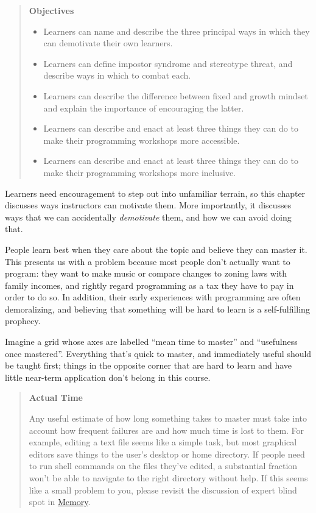 \documentclass[10pt,statementpaper]{memoir}
\providecommand{\tightlist}{%
  \setlength{\itemsep}{0pt}\setlength{\parskip}{0pt}}
\begin{document}
\begin{quote}
\textbf{Objectives}

\begin{itemize}
\tightlist
\item
  Learners can name and describe the three principal ways in which they
  can demotivate their own learners.
\item
  Learners can define impostor syndrome and stereotype threat, and
  describe ways in which to combat each.
\item
  Learners can describe the difference between fixed and growth mindset
  and explain the importance of encouraging the latter.
\item
  Learners can describe and enact at least three things they can do to
  make their programming workshops more accessible.
\item
  Learners can describe and enact at least three things they can do to
  make their programming workshops more inclusive.
\end{itemize}
\end{quote}

Learners need encouragement to step out into unfamiliar terrain, so this
chapter discusses ways instructors can motivate them. More importantly,
it discusses ways that we can accidentally \emph{demotivate} them, and
how we can avoid doing that.

People learn best when they care about the topic and believe they can
master it. This presents us with a problem because most people don't
actually want to program: they want to make music or compare changes to
zoning laws with family incomes, and rightly regard programming as a tax
they have to pay in order to do so. In addition, their early experiences
with programming are often demoralizing, and believing that something
will be hard to learn is a self-fulfilling prophecy.

Imagine a grid whose axes are labelled ``mean time to master'' and
``usefulness once mastered''. Everything that's quick to master, and
immediately useful should be taught first; things in the opposite corner
that are hard to learn and have little near-term application don't
belong in this course.

\begin{quote}
\textbf{Actual Time}

Any useful estimate of how long something takes to master must take into
account how frequent failures are and how much time is lost to them. For
example, editing a text file seems like a simple task, but most
graphical editors save things to the user's desktop or home directory.
If people need to run shell commands on the files they've edited, a
substantial fraction won't be able to navigate to the right directory
without help. If this seems like a small problem to you, please revisit
the discussion of expert blind spot in \href{memory.html}{Memory}.
\end{quote}
\end{document}
